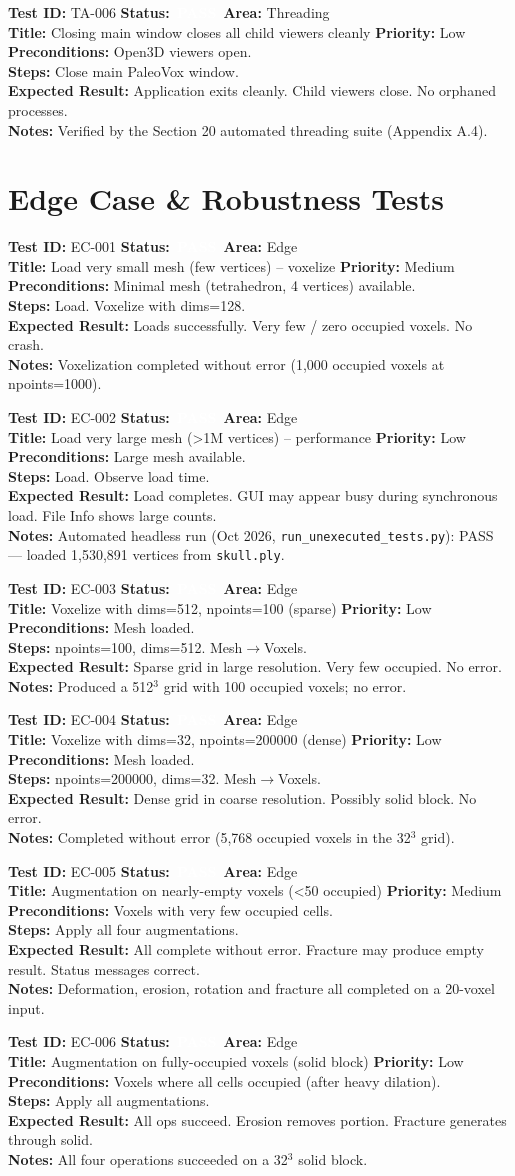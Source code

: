 \documentclass[12pt,a4paper]{article}
\newcommand{\statuspass}{\colorbox{statusgreen}{\textcolor{white}{\textbf{\,PASS\,}}}}
\newcommand{\testcase}[9]{%
  \smallskip
  \noindent\textbf{Test ID:} #1 \hfill \textbf{Status:} #2 \hfill \textbf{Area:} #3 \\
  \textbf{Title:} #4 \hfill \textbf{Priority:} #5 \\[0.3em]
  \textbf{Preconditions:} #6 \\[0.3em]
  \textbf{Steps:} #7 \\[0.3em]
  \textbf{Expected Result:} #8 \\
  \textbf{Notes:} #9
  \smallskip
}
\begin{document}
\testcase{TA-006}{\statuspass}{Threading}{Closing main window closes all child viewers cleanly}{Low}{Open3D viewers open.}{Close main PaleoVox window.}{Application exits cleanly. Child viewers close. No orphaned processes.}{Verified by the Section 20 automated threading suite (Appendix A.4).}



\section{Edge Case \& Robustness Tests}

\testcase{EC-001}{\statuspass}{Edge}{Load very small mesh (few vertices) -- voxelize}{Medium}{Minimal mesh (tetrahedron, 4 vertices) available.}{Load. Voxelize with dims=128.}{Loads successfully. Very few / zero occupied voxels. No crash.}{Voxelization completed without error (1,000 occupied voxels at npoints=1000).}


\testcase{EC-002}{\statuspass}{Edge}{Load very large mesh (>1M vertices) -- performance}{Low}{Large mesh available.}{Load. Observe load time.}{Load completes. GUI may appear busy during synchronous load. File Info shows large counts.}{Automated headless run (Oct 2026, \texttt{run\_unexecuted\_tests.py}): PASS --- loaded 1,530,891 vertices from \texttt{skull.ply}.}


\testcase{EC-003}{\statuspass}{Edge}{Voxelize with dims=512, npoints=100 (sparse)}{Low}{Mesh loaded.}{npoints=100, dims=512. Mesh$\rightarrow$Voxels.}{Sparse grid in large resolution. Very few occupied. No error.}{Produced a 512$^3$ grid with 100 occupied voxels; no error.}


\testcase{EC-004}{\statuspass}{Edge}{Voxelize with dims=32, npoints=200000 (dense)}{Low}{Mesh loaded.}{npoints=200000, dims=32. Mesh$\rightarrow$Voxels.}{Dense grid in coarse resolution. Possibly solid block. No error.}{Completed without error (5,768 occupied voxels in the 32$^3$ grid).}


\testcase{EC-005}{\statuspass}{Edge}{Augmentation on nearly-empty voxels (<50 occupied)}{Medium}{Voxels with very few occupied cells.}{Apply all four augmentations.}{All complete without error. Fracture may produce empty result. Status messages correct.}{Deformation, erosion, rotation and fracture all completed on a 20-voxel input.}


\testcase{EC-006}{\statuspass}{Edge}{Augmentation on fully-occupied voxels (solid block)}{Low}{Voxels where all cells occupied (after heavy dilation).}{Apply all augmentations.}{All ops succeed. Erosion removes portion. Fracture generates through solid.}{All four operations succeeded on a 32$^3$ solid block.}
\end{document}
